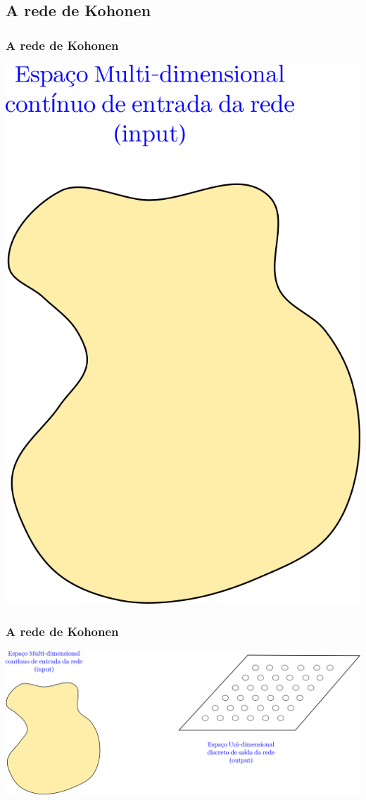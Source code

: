 \documentclass[10pt]{beamer} %
\begin{document}
\subsection{A rede de Kohonen}

\begin{frame}
	\frametitle{A rede de Kohonen}
	\includegraphics[scale=0.5]{Imagens/IntroKoho1.png} 
	
\end{frame}


\begin{frame}
	\frametitle{A rede de Kohonen}
	\includegraphics[scale=0.5]{Imagens/IntroKoho2.png} 
	
\end{frame}
\end{document}
